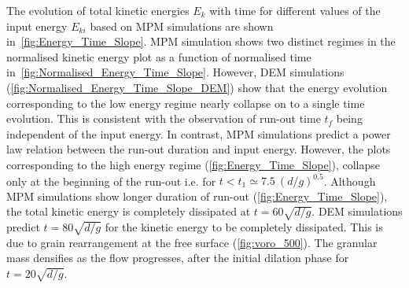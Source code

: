 The evolution of total kinetic energies $E_k$ with time for different values of 
the input energy $E_{ki}$ based on MPM simulations are shown 
in~\cref{fig:Energy_Time_Slope}. MPM simulation shows two distinct regimes in 
the normalised kinetic energy plot as a function of 
normalised time in~\cref{fig:Normalised_Energy_Time_Slope}. However, DEM 
simulations (\cref{fig:Normalised_Energy_Time_Slope_DEM}) show that the 
energy evolution corresponding to the low energy regime nearly collapse on to a 
single time evolution. This is consistent with the observation of run-out time 
$t_f$ being independent of the input energy. In contrast, MPM simulations 
predict a 
power law relation between the run-out duration and input energy. However, the 
plots corresponding to the high energy regime (\cref{fig:Energy_Time_Slope}), 
collapse only at the beginning of the run-out i.e. for $t < t_1 \simeq 7.5 \ 
(d/g)^{0.5}$. Although MPM simulations show longer duration of run-out 
(\cref{fig:Energy_Time_Slope}), the total kinetic energy is completely 
dissipated at $t = 60 \sqrt{d/g}$. DEM simulations predict $t = 80 \sqrt{d/g}$ 
for the kinetic energy to be completely dissipated. This is due to grain 
rearrangement at the free surface (\cref{fig:voro_500}). The granular mass 
densifies as the flow progresses, after the initial dilation phase for $t = 
20\sqrt{d/g}$.

